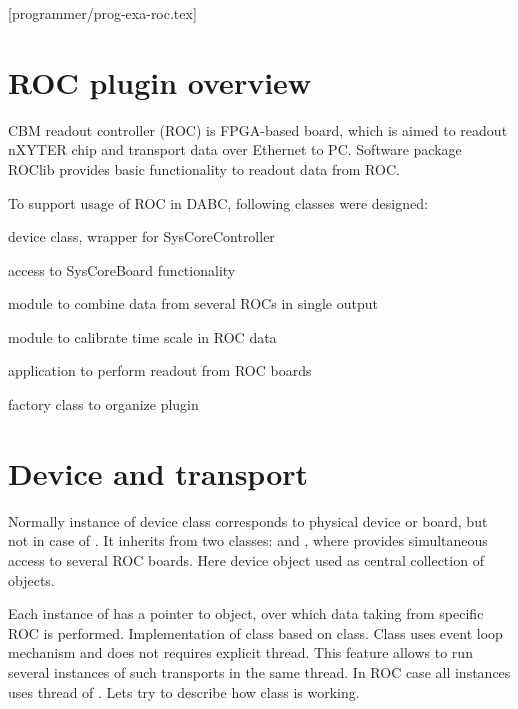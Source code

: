 [programmer/prog-exa-roc.tex]

\section{ROC plugin overview}

CBM readout controller (ROC) is FPGA-based board, which is aimed to readout
nXYTER chip and transport data over Ethernet to PC. Software package ROClib 
provides basic functionality to readout data from ROC.
 
To support usage of ROC in DABC, following classes were designed:
\bbul
\item {}  device class, wrapper for SysCoreController 
\item {}  access to SysCoreBoard functionality 
\item {}  module to combine data from several ROCs in single output  
\item {}  module to calibrate time scale in ROC data  
\item {}  application to perform readout from ROC boards   
\item {}  factory class to organize plugin 
\ebul


\section{Device and transport}

Normally instance of device class corresponds to physical device or board, but not in case
of . It inherits from two classes:  and ,
where  provides simultaneous access to several ROC boards. 
Here device object used as central collection of  objects.

Each instance of  has a pointer to  object,
over which data taking from specific ROC is performed. 
Implementation of class  based on  class.
Class  uses event loop mechanism and does not requires explicit thread.
This feature allows to run several instances of such transports in the same thread.
In ROC case all  instances uses thread of .     
Lets try to describe how class  is working.

